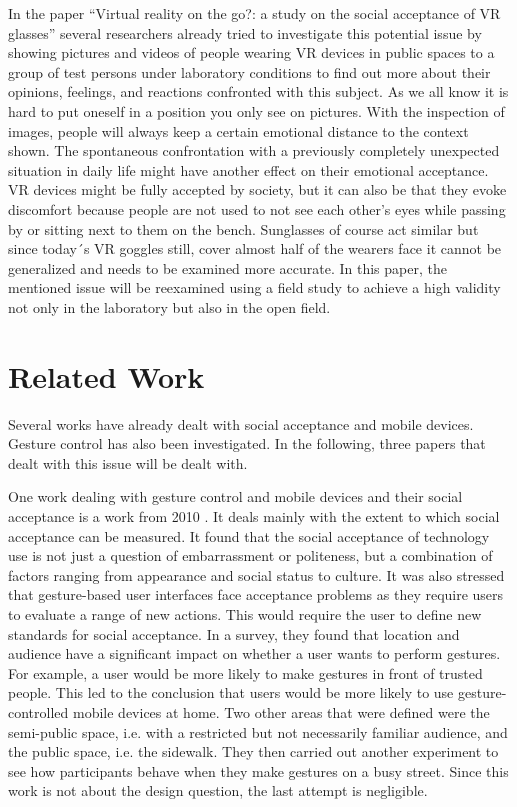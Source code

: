 \documentclass[sigchi]{acmart}
\begin{document}
In the paper “Virtual reality on the go?: a study on the social acceptance of VR glasses” \cite{schwind2018virtual} several researchers already tried to investigate this potential issue by showing pictures and videos of people wearing VR devices in public spaces to a group of test persons under laboratory conditions to find out more about their opinions, feelings, and reactions confronted with this subject. As we all know it is hard to put oneself in a position you only see on pictures. With the inspection of images, people will always keep a certain emotional distance to the context shown. 
The spontaneous confrontation with a previously completely unexpected situation in daily life might have another effect on their emotional acceptance. VR devices might be fully accepted by society, but it can also be that they evoke discomfort because people are not used to not see each other's eyes while passing by or sitting next to them on the bench. Sunglasses of course act similar but since today´s VR goggles still, cover almost half of the wearers face it cannot be generalized and needs to be examined more accurate.
In this paper, the mentioned issue will be reexamined using a field study to achieve a high validity not only in the laboratory but also in the open field.

\section{Related Work}
Several works have already dealt with social acceptance and mobile devices. Gesture control has also been investigated. In the following, three papers that dealt with this issue will be dealt with.

One work dealing with gesture control and mobile devices and their social acceptance is a work from 2010 \cite{rico2010usable}. It deals mainly with the extent to which social acceptance can be measured. It found that the social acceptance of technology use is not just a question of embarrassment or politeness, but a combination of factors ranging from appearance and social status to culture. It was also stressed that gesture-based user interfaces face acceptance problems as they require users to evaluate a range of new actions. This would require the user to define new standards for social acceptance. In a survey, they found that location and audience have a significant impact on whether a user wants to perform gestures. For example, a user would be more likely to make gestures in front of trusted people. This led to the conclusion that users would be more likely to use gesture-controlled mobile devices at home. Two other areas that were defined were the semi-public space, i.e. with a restricted but not necessarily familiar audience, and the public space, i.e. the sidewalk. They then carried out another experiment to see how participants behave when they make gestures on a busy street. Since this work is not about the design question, the last attempt is negligible.
\end{document}
